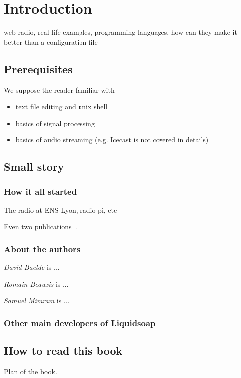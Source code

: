 \chapter{Introduction}
web radio, real life examples, programming languages, how can they make it
better than a configuration file

\section{Prerequisites}
We suppose the reader familiar with
\begin{itemize}
\item text file editing and unix shell
\item basics of signal processing
\item basics of audio streaming (e.g. Icecast is not covered in details)
\end{itemize}

\section{Small story}
\subsection{How it all started}
The radio at ENS Lyon, radio pi, etc

Even two publications~\cite{baelde2008webradio, baelde2011liquidsoap}.

\subsection{About the authors}
\emph{David Baelde} is ...

\emph{Romain Beauxis} is ...

\emph{Samuel Mimram} is ...

\subsection{Other main developers of Liquidsoap}

\section{How to read this book}
Plan of the book.